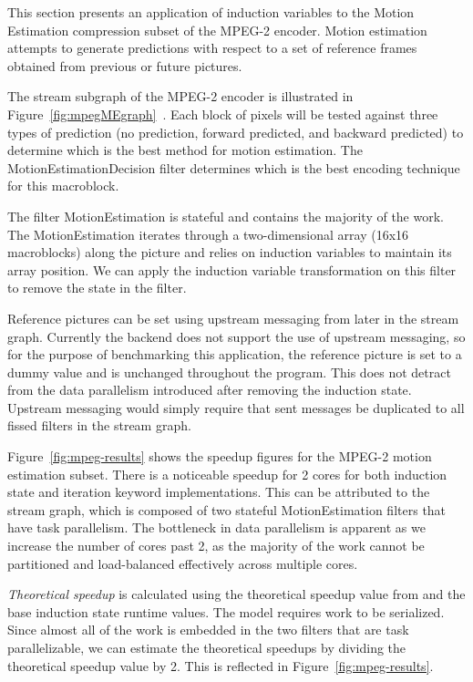This section presents an application of induction variables to the Motion Estimation compression subset of the MPEG-2 encoder.  Motion estimation attempts to generate predictions with respect to a set of reference frames obtained from previous or future pictures.  

The stream subgraph of the MPEG-2 encoder is illustrated in Figure~\ref{fig:mpegMEgraph}~\cite{drake-thesis}.  Each block of pixels will be tested against three types of prediction (no prediction, forward predicted, and backward predicted) to determine which is the best method for motion estimation.  The MotionEstimationDecision filter determines which is the best encoding technique for this macroblock.

The filter MotionEstimation is stateful and contains the majority of the work.  The MotionEstimation iterates through a two-dimensional array (16x16 macroblocks) along the picture and relies on induction variables to maintain its array position.  We can apply the induction variable transformation on this filter to remove the state in the filter.

Reference pictures can be set using upstream messaging from later in the stream graph.  Currently the backend does not support the use of upstream messaging, so for the purpose of benchmarking this application, the reference picture is set to a dummy value and is unchanged throughout the program.  This does not detract from the data parallelism introduced after removing the induction state.  Upstream messaging would simply require that sent messages be duplicated to all fissed filters in the stream graph.

Figure~\ref{fig:mpeg-results} shows the speedup figures for the MPEG-2 motion estimation subset.  There is a noticeable speedup for 2 cores for both induction state and iteration keyword implementations.  This can be attributed to the stream graph, which is composed of two stateful MotionEstimation filters that have task parallelism.  The bottleneck in data parallelism is apparent as we increase the number of cores past 2, as the majority of the work cannot be partitioned and load-balanced effectively across multiple cores.  

{\it Theoretical speedup} is calculated using the theoretical speedup value from \label{sec:model-analysis} and the base induction state runtime values.  The model requires work to be serialized.  Since almost all of the work is embedded in the two filters that are task parallelizable, we can estimate the theoretical speedups by dividing the theoretical speedup value by 2.  This is reflected in Figure~\ref{fig:mpeg-results}.

